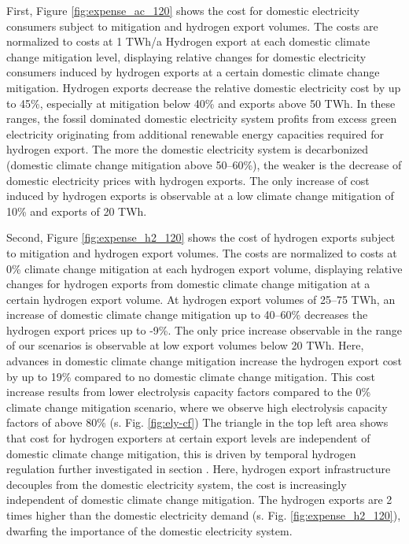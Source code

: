 First, Figure \ref{fig:expense_ac_120} shows the cost for domestic electricity consumers subject to mitigation and hydrogen export volumes. The costs are normalized to costs at 1 TWh/a Hydrogen export at each domestic climate change mitigation level, displaying relative changes for domestic electricity consumers induced by hydrogen exports at a certain domestic climate change mitigation.
Hydrogen exports decrease the relative domestic electricity cost by up to 45\%, especially at mitigation below 40\% and exports above 50 TWh. In these ranges, the fossil dominated domestic electricity system profits from excess green electricity originating from additional renewable energy capacities required for hydrogen export. The more the domestic electricity system is decarbonized (domestic climate change mitigation above 50--60\%), the weaker is the decrease of domestic electricity prices with hydrogen exports.
The only increase of cost induced by hydrogen exports is observable at a low climate change mitigation of 10\% and exports of 20 TWh. 

Second, Figure \ref{fig:expense_h2_120} shows the cost of hydrogen exports subject to mitigation and hydrogen export volumes. The costs are normalized to costs at 0\% climate change mitigation at each hydrogen export volume, displaying relative changes for hydrogen exports from domestic climate change mitigation at a certain hydrogen export volume.
At hydrogen export volumes of 25--75 TWh, an increase of domestic climate change mitigation up to 40--60\% decreases the hydrogen export prices up to -9\%. 
The only price increase observable in the range of our scenarios is observable at low export volumes below 20 TWh. Here, advances in domestic climate change mitigation increase the hydrogen export cost by up to 19\% compared to no domestic climate change mitigation.
This cost increase results from lower electrolysis capacity factors compared to the 0\% climate change mitigation scenario, where we observe high electrolysis capacity factors of above 80\% (s. Fig. \ref{fig:ely-cf})
The triangle in the top left area shows that cost for hydrogen exporters at certain export levels are independent of domestic climate change mitigation, this is driven by temporal hydrogen regulation further investigated in section . Here, hydrogen export infrastructure decouples from the domestic electricity system, the cost is increasingly independent of domestic climate change mitigation. The hydrogen exports are 2 times higher than the domestic electricity demand (s. Fig. \ref{fig:expense_h2_120}), dwarfing the importance of the domestic electricity system.


